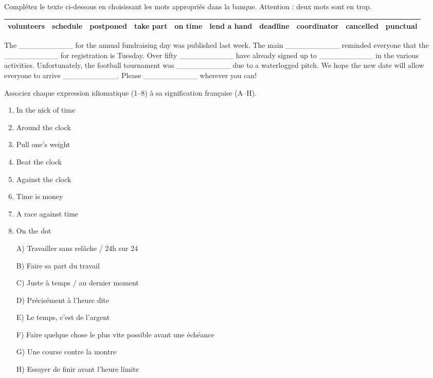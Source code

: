 \documentclass[11pt]{article}
\begin{document}
\begin{exercice}
Complétez le texte ci-dessous en choisissant les mots appropriés dans la banque. Attention : deux mots sont en trop.
\begin{center}
\begin{tabular}{|c|c|c|c|c|c|c|c|c|c|}
\hline
\textbf{volunteers} & \textbf{schedule} & \textbf{postponed} & \textbf{take part} & \textbf{on time} & \textbf{lend a hand} & \textbf{deadline} & \textbf{coordinator} & \textbf{cancelled} & \textbf{punctual} \\
\hline
\end{tabular}
\end{center}
\begin{textebox}
The \_\_\_\_\_\_\_\_\_\_ for the annual fundraising day was published last week. The main \_\_\_\_\_\_\_\_\_\_ reminded everyone that the \_\_\_\_\_\_\_\_\_\_ for registration is Tuesday. Over fifty \_\_\_\_\_\_\_\_\_\_ have already signed up to \_\_\_\_\_\_\_\_\_\_ in the various activities. Unfortunately, the football tournament was \_\_\_\_\_\_\_\_\_\_ due to a waterlogged pitch. We hope the new date will allow everyone to arrive \_\_\_\_\_\_\_\_\_\_. Please \_\_\_\_\_\_\_\_\_\_ wherever you can!
\end{textebox}
\end{exercice}

\begin{exercice}
Associez chaque expression idiomatique (1--8) à sa signification française (A--H).
\begin{enumerate}
\item In the nick of time
\item Around the clock
\item Pull one's weight
\item Beat the clock
\item Against the clock
\item Time is money
\item A race against time
\item On the dot
\end{enumerate}
\begin{itemize}
\item[A)] Travailler sans relâche / 24h sur 24
\item[B)] Faire sa part du travail
\item[C)] Juste à temps / au dernier moment
\item[D)] Précisément à l'heure dite
\item[E)] Le temps, c'est de l'argent
\item[F)] Faire quelque chose le plus vite possible avant une échéance
\item[G)] Une course contre la montre
\item[H)] Essayer de finir avant l'heure limite
\end{itemize}
\end{exercice}
\end{document}

